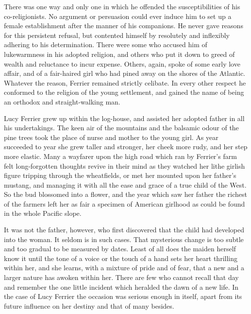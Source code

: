 \documentclass[12pt,english]{book}
\begin{document}
There was one way and only one in which he offended the susceptibilities
of his co-religionists. No argument or persuasion could ever induce
him to set up a female establishment after the manner of his companions.
He never gave reasons for this persistent refusal, but contented himself
by resolutely and inflexibly adhering to his determination. There
were some who accused him of lukewarmness in his adopted religion,
and others who put it down to greed of wealth and reluctance to incur
expense. Others, again, spoke of some early love affair, and of a
fair-haired girl who had pined away on the shores of the Atlantic.
Whatever the reason, Ferrier remained strictly celibate. In every
other respect he conformed to the religion of the young settlement,
and gained the name of being an orthodox and straight-walking man.

Lucy Ferrier grew up within the log-house, and assisted her adopted
father in all his undertakings. The keen air of the mountains and
the balsamic odour of the pine trees took the place of nurse and mother
to the young girl. As year succeeded to year she grew taller and stronger,
her cheek more rudy, and her step more elastic. Many a wayfarer upon
the high road which ran by Ferrier's farm felt long-forgotten thoughts
revive in their mind as they watched her lithe girlish figure tripping
through the wheatfields, or met her mounted upon her father's mustang,
and managing it with all the ease and grace of a true child of the
West. So the bud blossomed into a flower, and the year which saw her
father the richest of the farmers left her as fair a specimen of American
girlhood as could be found in the whole Pacific slope.

It was not the father, however, who first discovered that the child
had developed into the woman. It seldom is in such cases. That mysterious
change is too subtle and too gradual to be measured by dates. Least
of all does the maiden herself know it until the tone of a voice or
the touch of a hand sets her heart thrilling within her, and she learns,
with a mixture of pride and of fear, that a new and a larger nature
has awoken within her. There are few who cannot recall that day and
remember the one little incident which heralded the dawn of a new
life. In the case of Lucy Ferrier the occasion was serious enough
in itself, apart from its future influence on her destiny and that
of many besides.
\end{document}
